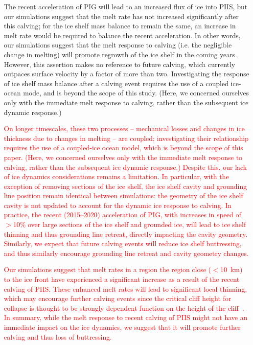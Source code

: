 \documentclass[draft]{agujournal2019}
\newcommand{\red}[1]{\textcolor{red}{#1}}
\begin{document}
The recent acceleration of PIG will lead to an increased flux of ice into PIIS, but our simulations suggest that the melt rate has not increased significantly after this calving; for the ice shelf mass balance to remain the same, an increase in melt rate would be required to balance the recent acceleration. In other words, our simulations suggest that the melt response to calving (i.e. the negligible change in melting) will promote regrowth of the ice shelf in the coming years. However, this assertion makes no reference to future calving, which currently outpaces surface velocity by a factor of more than two. Investigating the response of ice shelf mass balance after a calving event requires the use of a coupled ice-ocean mode, and is beyond the scope of this study. (Here, we concerned ourselves only with the immediate melt response to calving, rather than the subsequent ice dynamic response.)

\red{
On longer timescales, these two processes -- mechanical losses and changes in ice thickness due to changes in melting -- are coupled; investigating their relationship requires the use of a coupled-ice ocean model, which is beyond the scope of this paper. (Here, we concerned ourselves only with the immediate melt response to calving, rather than the subsequent ice dynamic response.) Despite this, our lack of ice dynamics considerations remains a limitation. In particular, with the exception of removing sections of the ice shelf, the ice shelf cavity and grounding line position remain identical between simulations: the geometry of the ice shelf cavity is not updated to account for the dynamic ice response to calving. In practice, the recent (2015--2020) acceleration of PIG, with increases in speed of $>$10\% over large sections of the ice shelf and grounded ice, will lead to ice shelf thinning and thus grounding line retreat, directly impacting the cavity geometry. Similarly, we expect that future calving events will reduce ice shelf buttressing, and thus similarly encourage grounding line retreat and cavity geometry changes.} 

\red{Our simulations suggest that melt rates in a region the region close ($<$10~km) to the ice front have experienced a significant increase as a result of the recent calving of PIIS. These enhanced melt rates will lead to significant local thinning, which may encourage further calving events since the critical cliff height for collapse is thought to be strongly dependent function on the height of the cliff~\cite[ for example]{Crawford2021NatureComms}. In summary, while the melt response to recent calving of PIIS might not have an immediate impact on the ice dynamics, we suggest that it will promote further calving and thus loss of buttressing.}
\end{document}
